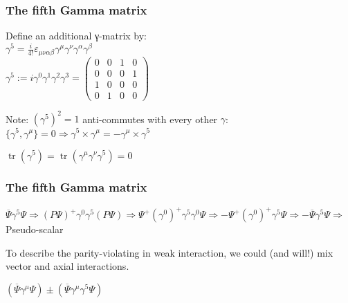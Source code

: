 \label{The fifth Gamma matrix}
\begin{frame}\frametitle{The fifth Gamma matrix}

Define an additional γ-matrix by:\\
$\gamma ^{5}={\frac {i}{4!}}\varepsilon _{\mu \nu \alpha \beta }\gamma ^{\mu }\gamma ^{\nu }\gamma ^{\alpha }\gamma ^{\beta }$
\\

${\displaystyle \gamma ^{5}:=i\gamma ^{0}\gamma ^{1}\gamma ^{2}\gamma ^{3}={\begin{pmatrix}0&0&1&0\\0&0&0&1\\1&0&0&0\\0&1&0&0\end{pmatrix}}}$



Note:
$(\gamma^5)^2 = 1$
anti-commutes with every other $\gamma$:
$\{\gamma^5,\gamma^\mu\}=0 \Longrightarrow \gamma^5\times \gamma^\mu = - \gamma^\mu \times \gamma^5 $

$\operatorname {tr} \left(\gamma ^{5}\right)=\operatorname {tr} \left(\gamma ^{\mu }\gamma ^{\nu }\gamma ^{5}\right)=0$


\end{frame}



\label{The fifth Gamma matrix}

\begin{frame}\frametitle{The fifth Gamma matrix}



$\overline{\Psi} \gamma^5 \Psi \Longrightarrow (P\Psi)^{+} \gamma^0 \gamma^5  (P\Psi)  \Longrightarrow \Psi^{+} (\gamma^0 )^{+} \gamma^5 \gamma^0 \Psi \Longrightarrow - \Psi^{+}  (\gamma^0 )^{+}  \gamma^5  \Psi \Longrightarrow  - \overline{\Psi} \gamma^5 \Psi \Longrightarrow $ Pseudo-scalar 
 



To describe the parity-violating in weak interaction, we could (and will!) mix vector and axial interactions.

$(\overline{\Psi}  \gamma^\mu \Psi) \pm (\overline{\Psi}  \gamma^\mu \gamma^5 \Psi)$




\end{frame}
